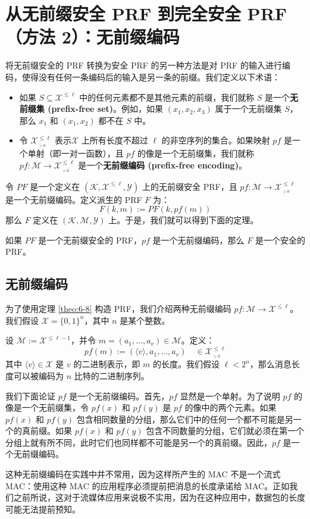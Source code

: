 \section{从无前缀安全 PRF 到完全安全 PRF（方法 2）：无前缀编码}\label{sec:6-6}

将无前缀安全的 PRF 转换为安全 PRF 的另一种方法是对 PRF 的输入进行编码，使得没有任何一条编码后的输入是另一条的前缀。我们定义以下术语：
\begin{itemize}
	\item 如果 $S\subseteq\mathcal{X}^{\leq\ell}$ 中的任何元素都不是其他元素的前缀，我们就称 $S$ 是一个\textbf{无前缀集 (prefix-free set)}。例如，如果 $(x_1,x_2,x_3)$ 属于一个无前缀集 $S$，那么 $x_1$ 和 $(x_1,x_2)$ 都不在 $S$ 中。
	\item 令 $\mathcal{X}^{\leq\ell}_{_{>0}}$ 表示$\mathcal{X}$ 上所有长度不超过 $\ell$ 的非空序列的集合。如果映射 $pf$ 是一个单射（即一对一函数），且 $pf$ 的像是一个无前缀集，我们就称 $pf:\mathcal{M}\to\mathcal{X}^{\leq\ell}_{_{>0}}$ 是一个\textbf{无前缀编码 (prefix-free encoding)}。
\end{itemize}

令 $PF$ 是一个定义在 $(\mathcal{K},\mathcal{X}^{\leq\ell},\mathcal{Y})$ 上的无前缀安全 PRF，且 $pf:\mathcal{M}\to\mathcal{X}^{\leq\ell}_{_{>0}}$ 是一个无前缀编码。定义派生的 PRF $F$ 为：
\[
F(k,m):=PF(k,pf(m))
\]
那么 $F$ 定义在 $(\mathcal{K},\mathcal{M},\mathcal{Y})$ 上。于是，我们就可以得到下面的定理。

\begin{theorem}\label{theo:6-8}
如果 $PF$ 是一个无前缀安全的 PRF，$pf$ 是一个无前缀编码，那么 $F$ 是一个安全的 PRF。
\end{theorem}

\subsection{无前缀编码}\label{subsec:6-6-1}

为了使用定理 \ref{theo:6-8} 构造 PRF，我们介绍两种无前缀编码 $pf:\mathcal{M}\to\mathcal{X}^{\leq\ell}$。我们假设 $\mathcal{X}=\{0,1\}^n$，其中 $n$ 是某个整数。

\begin{snote}[方法 1：前置长度。]
设 $\mathcal{M}:=\mathcal{X}^{\leq\ell-1}$，并令 $m=(a_1,\dots,a_v)\in\mathcal{M}$。定义：
\[
pf(m):=(\langle v\rangle,a_1,\dots,a_v)\quad\in\mathcal{X}^{\leq\ell}_{_{>0}}
\]
其中 $\langle v\rangle\in\mathcal{X}$ 是 $v$ 的二进制表示，即 $m$ 的长度。我们假设 $\ell<2^n$，那么消息长度可以被编码为 $n$ 比特的二进制序列。

我们下面论证 $pf$ 是一个无前缀编码。首先，$pf$ 显然是一个单射。为了说明 $pf$ 的像是一个无前缀集，令 $pf(x)$ 和 $pf(y)$ 是 $pf$ 的像中的两个元素。如果 $pf(x)$ 和 $pf(y)$ 包含相同数量的分组，那么它们中的任何一个都不可能是另一个的真前缀。如果 $pf(x)$ 和 $pf(y)$ 包含不同数量的分组，它们就必须在第一个分组上就有所不同，此时它们也同样都不可能是另一个的真前缀。因此，$pf$ 是一个无前缀编码。

这种无前缀编码在实践中并不常用，因为这样所产生的 MAC 不是一个流式 MAC：使用这种 MAC 的应用程序必须提前把消息的长度承诺给 MAC。正如我们之前所说，这对于流媒体应用来说极不实用，因为在这种应用中，数据包的长度可能无法提前预知。
\end{snote}

